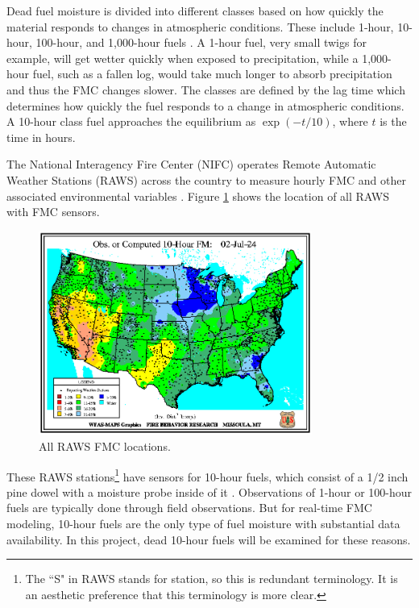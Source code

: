 \documentclass[11pt]{article}%
\begin{document}
Dead fuel moisture is divided into different classes based on how quickly the material responds to changes in atmospheric conditions. These include 1-hour, 10-hour, 100-hour, and 1,000-hour fuels \cite{NCEI-2024-DFM}. A 1-hour fuel, very small twigs for example, will get wetter quickly when exposed to precipitation, while a 1,000-hour fuel, such as a fallen log, would take much longer to absorb precipitation and thus the FMC changes slower. The classes are defined by the lag time which determines how quickly the fuel responds to a change in atmospheric conditions. A 10-hour class fuel approaches the equilibrium as $\exp(-t/10)$, where $t$ is the time in hours.

The National Interagency Fire Center (NIFC) operates Remote Automatic Weather Stations (RAWS) across the country to measure hourly FMC and other associated environmental variables \cite{NIFC-2024-RAW}. Figure \ref{fig:wfas_raws} shows the location of all RAWS with FMC sensors.

\begin{figure}[ht]
    \centering
    \includegraphics[width=0.8\textwidth]{images/WFAS-RAWS-map.png}
    \caption{All RAWS FMC locations.}
    \label{fig:wfas_raws}
\end{figure}

These RAWS stations\footnote{The ``S" in RAWS stands for station, so this is redundant terminology. It is an aesthetic preference that this terminology is more clear.} have sensors for 10-hour fuels, which consist of a 1/2 inch pine dowel with a moisture probe inside of it \cite{Campbell-2017-RMM}. Observations of 1-hour or 100-hour fuels are typically done through field observations. But for real-time FMC modeling, 10-hour fuels are the only type of fuel moisture with substantial data availability. In this project, dead 10-hour fuels will be examined for these reasons.
\end{document}
